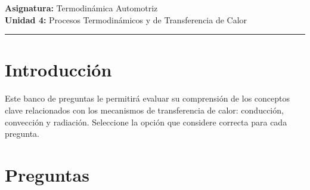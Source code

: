 \documentclass{article}
\begin{document}

\textbf{Asignatura:} Termodinámica Automotriz \\
\textbf{Unidad 4:} Procesos Termodinámicos y de Transferencia de Calor

\vspace{5mm}
\hrule
\vspace{5mm}

\section*{Introducción}

Este banco de preguntas le permitirá evaluar su comprensión de los conceptos clave relacionados con los mecanismos de transferencia de calor: conducción, convección y radiación. Seleccione la opción que considere correcta para cada pregunta.

\section*{Preguntas}
\end{document}
